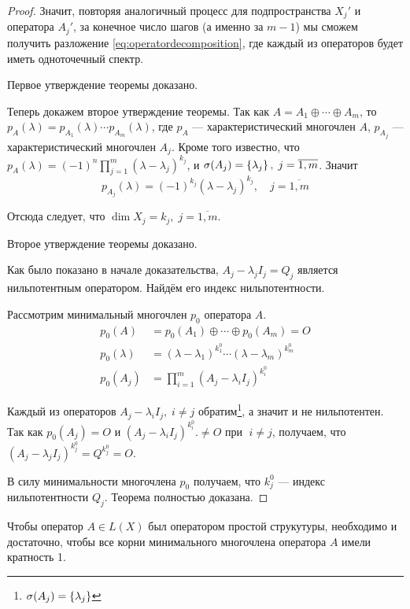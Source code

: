 \begin{proof}
    Значит, повторяя аналогичный процесс для подпространства $X_j'$ и оператора
    $A_j'$, за конечное число шагов (а именно за $m-1$) мы сможем получить разложение
    \eqref{eq:operatordecomposition}, где каждый из операторов будет иметь
    одноточечный спектр.

    Первое утверждение теоремы доказано.

    Теперь докажем второе утверждение теоремы.
    Так как $A = A_1 \oplus \dotsb \oplus A_m$, то
    $p_A(\lambda) = p_{A_1}(\lambda)\dotsm p_{A_m}(\lambda)$, где $p_A$ —
    характеристический многочлен $A$, $p_{A_j}$ — характеристический многочлен
    $A_j$. Кроме того известно, что $p_A(\lambda) = (-1)^n
    \prod\limits_{j=1}^m(\lambda - \lambda_j)^{k_j}$, и $\operatorname{\sigma}(A_j) =
    \left\{\lambda_j\right\}, \; j = \overline{1,m}$. Значит
    \[ p_{A_j}(\lambda) = (-1)^{k_j} (\lambda - \lambda_j)^{k_j}, \quad j =
        \overline{1,m} \]

    Отсюда следует, что $\dim X_j = k_j, \; j = \overline{1,m}$. 
    
    Второе утверждение теоремы доказано.

    Как было показано в начале доказательства, 
    $A_j - \lambda_j I_j = Q_j$ является нильпотентным оператором.
    Найдём его индекс нильпотентности.

    Рассмотрим минимальный многочлен $p_0$ оператора $A$.
    \begin{align*}
        p_0(A) &= p_0(A_1) \oplus \dotsb \oplus p_0(A_m) = O \\
        p_0(\lambda) &= (\lambda - \lambda_1)^{k_1^0} \dotsm
        (\lambda-\lambda_m)^{k_m^0} \\
        p_0(A_j) &= \prod_{i=1}^m (A_j - \lambda_i I_j)^{k_i^0}
    \end{align*}

    Каждый из операторов $A_j - \lambda_i I_j, \; i \neq j$ обратим\footnote{
        $\operatorname{\sigma}(A_j) = \left\{\lambda_j\right\}$}, а значит и не нильпотентен. Так как
        $p_0(A_j) = O$ и $(A_j -\lambda_i I_j)^{k_i^0}. \neq O \text{ при } \; i \neq j$,
        получаем, что $(A_j - \lambda_j I_j)^{k_j^0} = Q^{k_j^0} = O$.

    В силу минимальности многочлена $p_0$ получаем, что $k_j^0$ — индекс
    нильпотентности $Q_j$. Теорема полностью доказана.
\end{proof}

\begin{theorem}
    Чтобы оператор $A\in L(X)$ был оператором простой струкутуры, необходимо и
    достаточно, чтобы все корни минимального многочлена оператора $A$ имели
    кратность 1.
\end{theorem}

